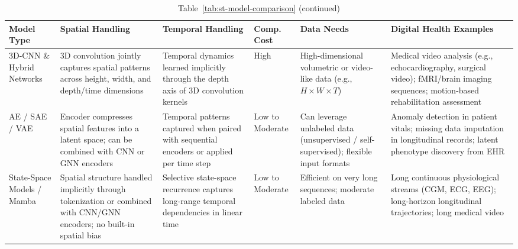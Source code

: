 \documentclass[acmsmall]{acmart}
\begin{document}
 
 
\begin{table}[htbp]
\centering
\caption*{Table~\ref{tab:st-model-comparison} (continued)}
\small
\renewcommand{\arraystretch}{1.35}
\begin{tabularx}{\textwidth}{>{\raggedright\arraybackslash}p{2.2cm} >{\raggedright\arraybackslash}p{2.5cm} >{\raggedright\arraybackslash}p{2.5cm} >{\raggedright\arraybackslash}p{1.4cm} >{\raggedright\arraybackslash}p{1.8cm} >{\raggedright\arraybackslash}X}
\toprule
\textbf{Model Type} & \textbf{Spatial Handling} & \textbf{Temporal Handling} & \textbf{Comp. Cost} & \textbf{Data Needs} & \textbf{Digital Health Examples} \\
\midrule
 
3D-CNN \& Hybrid Networks
& 3D convolution jointly captures spatial patterns across height, width, and depth/time dimensions
& Temporal dynamics learned implicitly through the depth axis of 3D convolution kernels
& High
& High-dimensional volumetric or video-like data (e.g., $H \times W \times T$)
& Medical video analysis (e.g., echocardiography, surgical video); fMRI/brain imaging sequences; motion-based rehabilitation assessment \\
 
\addlinespace[4pt]
 
AE / SAE / VAE
& Encoder compresses spatial features into a latent space; can be combined with CNN or GNN encoders
& Temporal patterns captured when paired with sequential encoders or applied per time step
& Low to Moderate
& Can leverage unlabeled data (unsupervised / self-supervised); flexible input formats
& Anomaly detection in patient vitals; missing data imputation in longitudinal records; latent phenotype discovery from EHR \\

 
\addlinespace[4pt]

State-Space Models / Mamba
& Spatial structure handled implicitly through tokenization or combined with CNN/GNN encoders; no built-in spatial bias
& Selective state-space recurrence captures long-range temporal dependencies in linear time
& Low to Moderate
& Efficient on very long sequences; moderate labeled data
& Long continuous physiological streams (CGM, ECG, EEG); long-horizon longitudinal trajectories; long medical video \\



\bottomrule
\end{tabularx}
\end{table}
\end{document}
